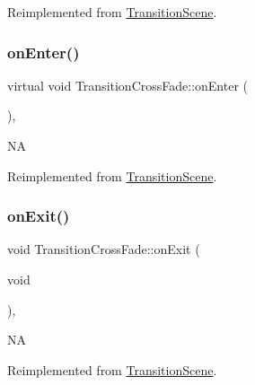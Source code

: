 Reimplemented from \hyperlink{classTransitionScene_aace390a1bd8f3c73bb650a1e256a0f83}{Transition\+Scene}.

\mbox{\label{classTransitionCrossFade_acd2958371059f6a1accb7ad12645090a}} 
\subsubsection{\texorpdfstring{on\+Enter()}{onEnter()}\hspace{0.1cm}{\footnotesize\ttfamily [2/2]}}
{\footnotesize\ttfamily virtual void Transition\+Cross\+Fade\+::on\+Enter (\begin{DoxyParamCaption}{ }\end{DoxyParamCaption})\hspace{0.3cm}{\ttfamily [override]}, {\ttfamily [virtual]}}

NA 

Reimplemented from \hyperlink{classTransitionScene_aace390a1bd8f3c73bb650a1e256a0f83}{Transition\+Scene}.

\mbox{\label{classTransitionCrossFade_a87aa5397c6cdba91bd477a9df1534730}} 
\subsubsection{\texorpdfstring{on\+Exit()}{onExit()}\hspace{0.1cm}{\footnotesize\ttfamily [1/2]}}
{\footnotesize\ttfamily void Transition\+Cross\+Fade\+::on\+Exit (\begin{DoxyParamCaption}\item[{void}]{ }\end{DoxyParamCaption})\hspace{0.3cm}{\ttfamily [override]}, {\ttfamily [virtual]}}

NA 

Reimplemented from \hyperlink{classTransitionScene_a45e39b658189c79428a05c3bc3173bbb}{Transition\+Scene}.

\mbox{\label{classTransitionCrossFade_a18832603241957b4c6700b84b7b587e0}} 
